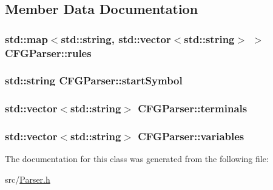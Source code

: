\subsection{\-Member \-Data \-Documentation}
\hypertarget{classCFGParser_a9bea0a4314c8f16ac9aaf0a801a42d86}{
\subsubsection[{rules}]{\setlength{\rightskip}{0pt plus 5cm}std\-::map$<$std\-::string, std\-::vector$<$std\-::string$>$ $>$ {\bf \-C\-F\-G\-Parser\-::rules}}}\label{da/d24/classCFGParser_a9bea0a4314c8f16ac9aaf0a801a42d86}
\hypertarget{classCFGParser_a3a51f2f7a2f5342ce9016d226869a516}{
\subsubsection[{start\-Symbol}]{\setlength{\rightskip}{0pt plus 5cm}std\-::string {\bf \-C\-F\-G\-Parser\-::start\-Symbol}}}\label{da/d24/classCFGParser_a3a51f2f7a2f5342ce9016d226869a516}
\hypertarget{classCFGParser_a7242b5a22e08de31297dc9bbb367f5bc}{
\subsubsection[{terminals}]{\setlength{\rightskip}{0pt plus 5cm}std\-::vector$<$std\-::string$>$ {\bf \-C\-F\-G\-Parser\-::terminals}}}\label{da/d24/classCFGParser_a7242b5a22e08de31297dc9bbb367f5bc}
\hypertarget{classCFGParser_a2be700c7eebe5a1a0fd18b88b3074840}{
\subsubsection[{variables}]{\setlength{\rightskip}{0pt plus 5cm}std\-::vector$<$std\-::string$>$ {\bf \-C\-F\-G\-Parser\-::variables}}}\label{da/d24/classCFGParser_a2be700c7eebe5a1a0fd18b88b3074840}


\-The documentation for this class was generated from the following file\-:\begin{DoxyCompactItemize}
\item 
src/\hyperlink{Parser_8h}{\-Parser.\-h}\end{DoxyCompactItemize}
